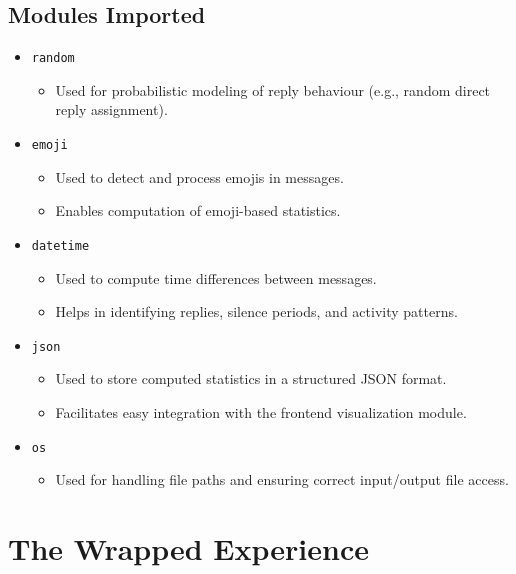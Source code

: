 \documentclass[11pt,a4paper]{article}
\begin{document}
\subsection{Modules Imported}
\begin{itemize}
    \item \texttt{random}
    \begin{itemize}
        \item Used for probabilistic modeling of reply behaviour (e.g., random direct reply assignment).
    \end{itemize}

    \item \texttt{emoji}\cite{emoji}
    \begin{itemize}
        \item Used to detect and process emojis in messages.
        \item Enables computation of emoji-based statistics.
    \end{itemize}

    \item \texttt{datetime}
    \begin{itemize}
        \item Used to compute time differences between messages.
        \item Helps in identifying replies, silence periods, and activity patterns.
    \end{itemize}

    \item \texttt{json}
    \begin{itemize}
        \item Used to store computed statistics in a structured JSON format.
        \item Facilitates easy integration with the frontend visualization module.
    \end{itemize}

    \item \texttt{os}
    \begin{itemize}
        \item Used for handling file paths and ensuring correct input/output file access.
    \end{itemize}
\end{itemize}

\newpage

\section{The Wrapped Experience}
\end{document}

